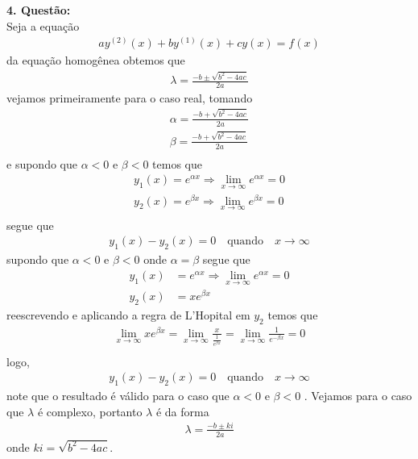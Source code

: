 \documentclass[a4paper,12pt]{article}
\begin{document}
\textbf{4. Quest\~ao:}\\
Seja a equa\c c\~ao 
\begin{align*}
	ay^{(2)}(x) + by^{(1)}(x) + cy(x) = f(x)
\end{align*}
da equa\c c\~ao homog\^enea obtemos que 
\begin{align*}
	{\lambda} = \frac{-b \pm \sqrt{b^{2} - 4ac}}{2a}
\end{align*}
vejamos primeiramente para o caso real, tomando 
\begin{align*}
	\alpha =  \frac{-b + \sqrt{b^{2} - 4ac}}{2a}\\
	\beta =  \frac{-b + \sqrt{b^{2} - 4ac}}{2a}\\
\end{align*}
e supondo que $\alpha < 0$ e $\beta < 0$ temos que 
\begin{align*}
	y_1(x) = e^{{\alpha}x} \Rightarrow \lim_{x \rightarrow \infty}  e^{{\alpha}x} = 0\\
	y_2(x) = e^{{\beta}x} \Rightarrow \lim_{x \rightarrow \infty}  e^{{\beta}x} = 0\\
\end{align*}
segue que 
\begin{align*}
	y_1(x) - y_2 (x) = 0  \quad \textrm{quando} \quad x \rightarrow \infty
\end{align*}
supondo que  $\alpha < 0$ e $\beta < 0$ onde $\alpha = \beta$ segue que 
\begin{align*}
	y_1(x) &= e^{{\alpha}x} \Rightarrow \lim_{x \rightarrow \infty}  e^{{\alpha}x} = 0\\
	y_2(x) &= xe^{{\beta}x} 
\end{align*}
reescrevendo e aplicando a regra de L'Hopital em $y_2$ temos que
\begin{align*}
	\lim_{x \rightarrow \infty}  xe^{{\beta}x} = \lim_{x \rightarrow \infty}  \frac{x}{\frac{1}{e^{{\beta}x}}} =
	\lim_{x \rightarrow \infty} \frac{1}{e^{{-\beta}x}} = 0\\
\end{align*}
logo, 
\begin{align*}
	y_1(x) - y_2 (x) = 0  \quad \textrm{quando} \quad x \rightarrow \infty
\end{align*}
note que o resultado \'e v\'alido para o caso que $\alpha < 0$ e $\beta < 0 $ . Vejamos para o caso que $\lambda$ \'e
complexo, portanto $\lambda$ \'e da forma 
\begin{align*}
	{\lambda} = \frac{-b \pm ki}{2a}
	\end{align*}
onde $ki = \sqrt{b^{2} - 4ac}$.
\end{document}
